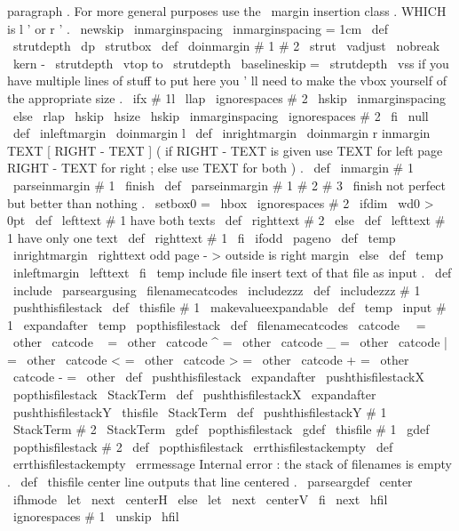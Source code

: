 paragraph
.
For
more
general
purposes
use
the
\
margin
insertion
%
class
.
WHICH
is
l
'
or
r
'
.
%
\
newskip
\
inmarginspacing
\
inmarginspacing
=
1cm
\
def
\
strutdepth
{
\
dp
\
strutbox
}
%
\
def
\
doinmargin
#
1
#
2
{
\
strut
\
vadjust
{
%
\
nobreak
\
kern
-
\
strutdepth
\
vtop
to
\
strutdepth
{
%
\
baselineskip
=
\
strutdepth
\
vss
%
if
you
have
multiple
lines
of
stuff
to
put
here
you
'
ll
need
to
%
make
the
vbox
yourself
of
the
appropriate
size
.
\
ifx
#
1l
%
\
llap
{
\
ignorespaces
#
2
\
hskip
\
inmarginspacing
}
%
\
else
\
rlap
{
\
hskip
\
hsize
\
hskip
\
inmarginspacing
\
ignorespaces
#
2
}
%
\
fi
\
null
}
%
}
}
\
def
\
inleftmargin
{
\
doinmargin
l
}
\
def
\
inrightmargin
{
\
doinmargin
r
}
%
%
inmargin
{
TEXT
[
RIGHT
-
TEXT
]
}
%
(
if
RIGHT
-
TEXT
is
given
use
TEXT
for
left
page
RIGHT
-
TEXT
for
right
;
%
else
use
TEXT
for
both
)
.
%
\
def
\
inmargin
#
1
{
\
parseinmargin
#
1
\
finish
}
\
def
\
parseinmargin
#
1
#
2
#
3
\
finish
{
%
not
perfect
but
better
than
nothing
.
\
setbox0
=
\
hbox
{
\
ignorespaces
#
2
}
%
\
ifdim
\
wd0
>
0pt
\
def
\
lefttext
{
#
1
}
%
have
both
texts
\
def
\
righttext
{
#
2
}
%
\
else
\
def
\
lefttext
{
#
1
}
%
have
only
one
text
\
def
\
righttext
{
#
1
}
%
\
fi
%
\
ifodd
\
pageno
\
def
\
temp
{
\
inrightmargin
\
righttext
}
%
odd
page
-
>
outside
is
right
margin
\
else
\
def
\
temp
{
\
inleftmargin
\
lefttext
}
%
\
fi
\
temp
}
%
include
file
insert
text
of
that
file
as
input
.
%
\
def
\
include
{
\
parseargusing
\
filenamecatcodes
\
includezzz
}
\
def
\
includezzz
#
1
{
%
\
pushthisfilestack
\
def
\
thisfile
{
#
1
}
%
{
%
\
makevalueexpandable
\
def
\
temp
{
\
input
#
1
}
%
\
expandafter
}
\
temp
\
popthisfilestack
}
\
def
\
filenamecatcodes
{
%
\
catcode
\
\
=
\
other
\
catcode
~
=
\
other
\
catcode
^
=
\
other
\
catcode
_
=
\
other
\
catcode
|
=
\
other
\
catcode
<
=
\
other
\
catcode
>
=
\
other
\
catcode
+
=
\
other
\
catcode
-
=
\
other
}
\
def
\
pushthisfilestack
{
%
\
expandafter
\
pushthisfilestackX
\
popthisfilestack
\
StackTerm
}
\
def
\
pushthisfilestackX
{
%
\
expandafter
\
pushthisfilestackY
\
thisfile
\
StackTerm
}
\
def
\
pushthisfilestackY
#
1
\
StackTerm
#
2
\
StackTerm
{
%
\
gdef
\
popthisfilestack
{
\
gdef
\
thisfile
{
#
1
}
\
gdef
\
popthisfilestack
{
#
2
}
}
%
}
\
def
\
popthisfilestack
{
\
errthisfilestackempty
}
\
def
\
errthisfilestackempty
{
\
errmessage
{
Internal
error
:
the
stack
of
filenames
is
empty
.
}
}
\
def
\
thisfile
{
}
%
center
line
%
outputs
that
line
centered
.
%
\
parseargdef
\
center
{
%
\
ifhmode
\
let
\
next
\
centerH
\
else
\
let
\
next
\
centerV
\
fi
\
next
{
\
hfil
\
ignorespaces
#
1
\
unskip
\
hfil
}
%
}
